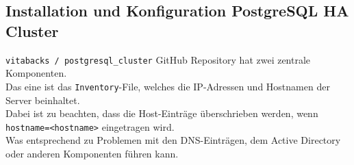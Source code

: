 
\begin{flushleft}
    \subsection{Installation und Konfiguration PostgreSQL HA Cluster}
    \texttt{vitabacks / postgresql\_cluster} \Gls{GitHub} Repository hat zwei zentrale Komponenten.\\
    Das eine ist das \texttt{Inventory}-File, welches die IP-Adressen und Hostnamen der Server beinhaltet.\\
    Dabei ist zu beachten, dass die Host-Einträge überschrieben werden, wenn \texttt{hostname=<hostname>} eingetragen wird.\\
    Was entsprechend zu Problemen mit den DNS-Einträgen, dem Active Directory oder anderen Komponenten führen kann.
\end{flushleft}
